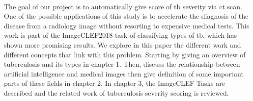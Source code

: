 \paragraph{}
The goal of our project is to automatically give score of \ac{tb} severity via \ac{ct} scan. One of the possible applications of this study is to accelerate the diagnosis of the disease from a radiology image without resorting to expensive medical tests. This work is part of the ImageCLEF2018  task of classifying types of \ac{tb}, which has shown more promising results. We explore in this paper the different work and different concepts that link with this problem. Starting by giving an overview of tuberculosis and its types in chapter 1. Then, discuss the relationship between artificial intelligence and medical images then give definition of some important parts of these fields in chapter 2. In chapter 3, the ImageCLEF Tasks are described and the related work of tuberculosis severity scoring is reviewed.